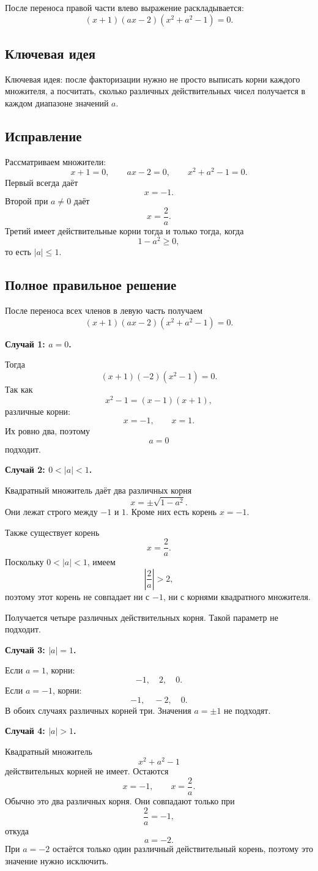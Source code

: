 \documentclass[12pt,a4paper]{article}
\begin{document}
После переноса правой части влево выражение раскладывается:
\[
(x+1)(ax-2)(x^2+a^2-1)=0.
\]

\subsection*{Ключевая идея}
\textcolor{blue!60!black}{Ключевая идея:} после факторизации нужно не просто выписать корни каждого множителя, а посчитать, сколько различных действительных чисел получается в каждом диапазоне значений $a$.

\subsection*{Исправление}
Рассматриваем множители:
\[
x+1=0,\qquad ax-2=0,\qquad x^2+a^2-1=0.
\]
Первый всегда даёт
\[
x=-1.
\]
Второй при $a\ne0$ даёт
\[
x=\frac2a.
\]
Третий имеет действительные корни тогда и только тогда, когда
\[
1-a^2\ge0,
\]
то есть $|a|\le1$.

\subsection*{Полное правильное решение}
После переноса всех членов в левую часть получаем
\[
(x+1)(ax-2)(x^2+a^2-1)=0.
\]

\textbf{Случай 1: $a=0$.}

Тогда
\[
(x+1)(-2)(x^2-1)=0.
\]
Так как
\[
x^2-1=(x-1)(x+1),
\]
различные корни:
\[
x=-1,\qquad x=1.
\]
Их ровно два, поэтому
\[
a=0
\]
подходит.

\textbf{Случай 2: $0<|a|<1$.}

Квадратный множитель даёт два различных корня
\[
x=\pm\sqrt{1-a^2}.
\]
Они лежат строго между $-1$ и $1$. Кроме них есть корень $x=-1$.

Также существует корень
\[
x=\frac2a.
\]
Поскольку $0<|a|<1$, имеем
\[
\left|\frac2a\right|>2,
\]
поэтому этот корень не совпадает ни с $-1$, ни с корнями квадратного множителя.

Получается четыре различных действительных корня. Такой параметр не подходит.

\textbf{Случай 3: $|a|=1$.}

Если $a=1$, корни:
\[
-1,\quad 2,\quad 0.
\]
Если $a=-1$, корни:
\[
-1,\quad -2,\quad 0.
\]
В обоих случаях различных корней три. Значения $a=\pm1$ не подходят.

\textbf{Случай 4: $|a|>1$.}

Квадратный множитель
\[
x^2+a^2-1
\]
действительных корней не имеет. Остаются
\[
x=-1,\qquad x=\frac2a.
\]
Обычно это два различных корня. Они совпадают только при
\[
\frac2a=-1,
\]
откуда
\[
a=-2.
\]
При $a=-2$ остаётся только один различный действительный корень, поэтому это значение нужно исключить.
\end{document}
